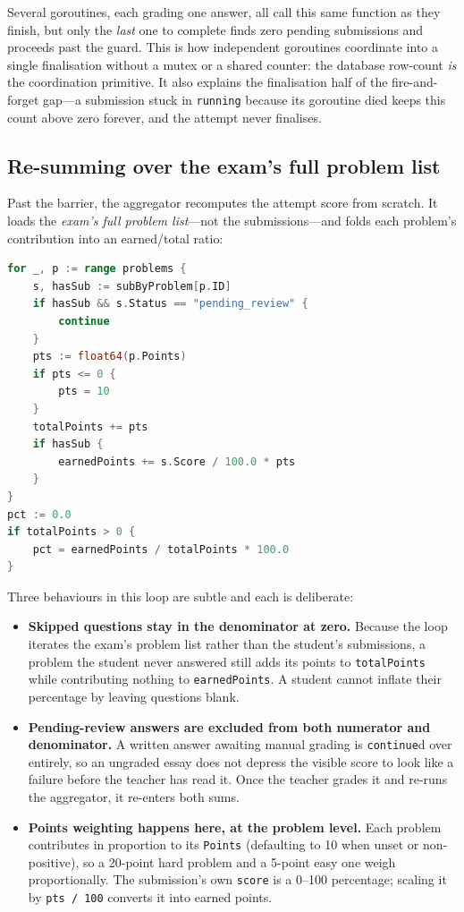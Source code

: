 Several goroutines, each grading one answer, all call this same function as they finish, but only
the \emph{last} one to complete finds zero pending submissions and proceeds past the guard. This
is how independent goroutines coordinate into a single finalisation without a mutex or a shared
counter: the database row-count \emph{is} the coordination primitive. It also explains the
finalisation half of the fire-and-forget gap---a submission stuck in \texttt{running} because its
goroutine died keeps this count above zero forever, and the attempt never finalises.

\subsection{Re-summing over the exam's full problem list}

Past the barrier, the aggregator recomputes the attempt score from scratch. It loads the
\emph{exam's full problem list}---not the submissions---and folds each problem's contribution
into an earned/total ratio:

\begin{lstlisting}[language=Go,caption={Points-weighted re-aggregation over the problem list (\texttt{grader.go}).},label={lst:aggregate}]
for _, p := range problems {
	s, hasSub := subByProblem[p.ID]
	if hasSub && s.Status == "pending_review" {
		continue
	}
	pts := float64(p.Points)
	if pts <= 0 {
		pts = 10
	}
	totalPoints += pts
	if hasSub {
		earnedPoints += s.Score / 100.0 * pts
	}
}
pct := 0.0
if totalPoints > 0 {
	pct = earnedPoints / totalPoints * 100.0
}
\end{lstlisting}

Three behaviours in this loop are subtle and each is deliberate:

\begin{itemize}[leftmargin=1.4em]
  \item \textbf{Skipped questions stay in the denominator at zero.} Because the loop iterates the
  exam's problem list rather than the student's submissions, a problem the student never answered
  still adds its points to \texttt{totalPoints} while contributing nothing to
  \texttt{earnedPoints}. A student cannot inflate their percentage by leaving questions blank.
  \item \textbf{Pending-review answers are excluded from both numerator and denominator.} A
  written answer awaiting manual grading is \texttt{continue}d over entirely, so an ungraded essay
  does not depress the visible score to look like a failure before the teacher has read it. Once
  the teacher grades it and re-runs the aggregator, it re-enters both sums.
  \item \textbf{Points weighting happens here, at the problem level.} Each problem contributes in
  proportion to its \texttt{Points} (defaulting to 10 when unset or non-positive), so a 20-point
  hard problem and a 5-point easy one weigh proportionally. The submission's own \texttt{score} is
  a 0--100 percentage; scaling it by \texttt{pts / 100} converts it into earned points.
\end{itemize}

